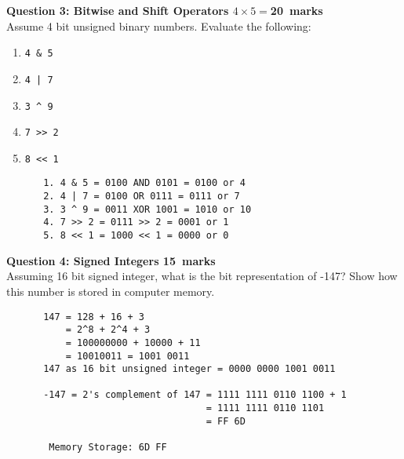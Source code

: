 \documentclass[12pt,a4paper]{article}
\def\Qthree{20}
\def\Qfour{15}
\begin{document}
\noindent\textbf{Question 3: Bitwise and Shift Operators \hfill $4\times 5=$\Qthree~marks}\\
Assume 4 bit unsigned binary numbers. Evaluate the following:
\begin{enumerate}
\item \verb|4 & 5|
\item \verb$4 | 7$
\item \verb|3 ^ 9|
\item \verb|7 >> 2|
\item \verb|8 << 1|
\end{enumerate}
\begin{figure}[H]
\begin{lstlisting}
 1. 4 & 5 = 0100 AND 0101 = 0100 or 4
 2. 4 | 7 = 0100 OR 0111 = 0111 or 7
 3. 3 ^ 9 = 0011 XOR 1001 = 1010 or 10
 4. 7 >> 2 = 0111 >> 2 = 0001 or 1
 5. 8 << 1 = 1000 << 1 = 0000 or 0
\end{lstlisting}
\vspace{-2.75cm}
\end{figure}

\noindent\textbf{Question 4: Signed Integers \hfill \Qfour~marks}\\
Assuming 16 bit signed integer, what is the bit representation of -147? Show how this number is stored in computer memory.
\begin{figure}[H]
\begin{lstlisting}
 147 = 128 + 16 + 3
     = 2^8 + 2^4 + 3
     = 100000000 + 10000 + 11
     = 10010011 = 1001 0011
 147 as 16 bit unsigned integer = 0000 0000 1001 0011
 
 -147 = 2's complement of 147 = 1111 1111 0110 1100 + 1
                              = 1111 1111 0110 1101
                              = FF 6D
                              
  Memory Storage: 6D FF
\end{lstlisting}
\vspace{-5.75cm}
\end{figure}
\end{document}
